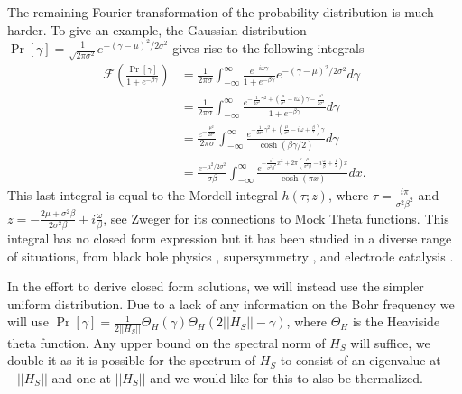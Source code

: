 \documentclass[
 amsmath,amssymb,
 aps,
onecolumn, 
nofootinbib]{revtex4-2}
\newcommand{\norm}[1]{\left|\left| #1 \right|\right|}
\begin{document}
The remaining Fourier transformation of the probability distribution is much harder. To give an example, the Gaussian distribution $\Pr[\gamma] = \frac{1}{\sqrt{2 \pi \sigma^2}} e^{-(\gamma - \mu)^2 / 2 \sigma^2}$ gives rise to the following integrals
\begin{align}
    \mathcal{F}\left(\frac{\Pr[\gamma]}{1 + e^{-\beta \gamma}}\right) &= \frac{1}{2 \pi \sigma} \int_{-\infty}^{\infty} \frac{e^{-i \omega \gamma}}{1 + e^{-\beta \gamma}} e^{-(\gamma - \mu)^2 / 2 \sigma^2} d \gamma \\
    &= \frac{1}{2 \pi \sigma}\int_{-\infty}^{\infty} \frac{e^{-\frac{1}{2\sigma^2} \gamma^2 + \left(\frac{\mu}{\sigma^2} - i \omega \right) \gamma - \frac{\mu^2}{2 \sigma^2}} }{1 + e^{-\beta \gamma}} d \gamma \\
    &= \frac{e^{-\frac{\mu^2}{2 \sigma^2}}}{2 \pi \sigma} \int_{-\infty}^{\infty} \frac{e^{- \frac{1}{2 \sigma^2} \gamma^2 + \left(\frac{\mu}{\sigma^2} -i \omega + \frac{\beta}{2}\right) \gamma}}{\cosh(\beta \gamma /2)} d\gamma \\
    &= \frac{e^{-\mu^2 / 2 \sigma^2}}{\sigma \beta} \int_{-\infty}^{\infty} \frac{e^{- \frac{\pi^2}{\sigma^2 \beta^2} x^2 + 2 \pi \left( \frac{\mu}{\sigma^2 \beta} - i \frac{\omega}{\beta} + \frac{1}{2} \right) x}}{\cosh(\pi x)} dx.
\end{align}
This last integral is equal to the Mordell integral $h(\tau; z)$, where $\tau = \frac{i\pi}{\sigma^2 \beta^2}$ and $z = -\frac{2\mu + \sigma^2 \beta}{2\sigma^2 \beta} +i \frac{\omega}{\beta}$, see Zweger \cite{zwegers2008mock} for its connections to Mock Theta functions. This integral has no closed form expression but it has been studied in a diverse range of situations, from black hole physics \cite{dabholkar2012quantum}, supersymmetry \cite{russo2015supersymmetric}, and electrode catalysis \cite{zeng2014electrocatalysis}. 

In the effort to derive closed form solutions, we will instead use the simpler uniform distribution. Due to a lack of any information on the Bohr frequency we will use $\Pr[\gamma] = \frac{1}{2 \norm{H_S}} \Theta_H(\gamma) \Theta_H(2 \norm{H_S} - \gamma)$, where $\Theta_H$ is the Heaviside theta function. Any upper bound on the spectral norm of $H_S$ will suffice, we double it as it is possible for the spectrum of $H_S$ to consist of an eigenvalue at $- \norm{H_S}$ and one at $\norm{H_S}$ and we would like for this to also be thermalized. 
\end{document}
